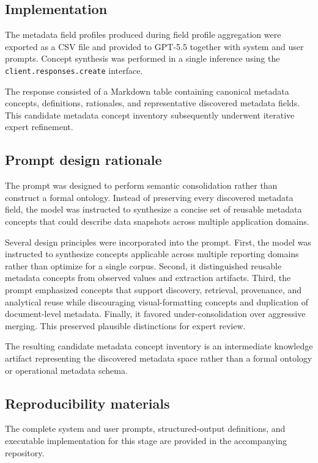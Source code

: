 \documentclass{article}
\begin{document}
\subsection{Implementation}

The metadata field profiles produced during field profile aggregation were exported as a CSV file and provided to GPT-5.5 together with system and user prompts. Concept synthesis was performed in a single inference using the \texttt{client.responses.create} interface.

The response consisted of a Markdown table containing canonical metadata concepts, definitions, rationales, and representative discovered metadata fields. This candidate metadata concept inventory subsequently underwent iterative expert refinement.

\subsection{Prompt design rationale}

The prompt was designed to perform semantic consolidation rather than construct a formal ontology. Instead of preserving every discovered metadata field, the model was instructed to synthesize a concise set of reusable metadata concepts that could describe data snapshots across multiple application domains.

Several design principles were incorporated into the prompt. First, the model was instructed to synthesize concepts applicable across multiple reporting domains rather than optimize for a single corpus. Second, it distinguished reusable metadata concepts from observed values and extraction artifacts. Third, the prompt emphasized concepts that support discovery, retrieval, provenance, and analytical reuse while discouraging visual-formatting concepts and duplication of document-level metadata. Finally, it favored under-consolidation over aggressive merging. This preserved plausible distinctions for expert review.

The resulting candidate metadata concept inventory is an intermediate knowledge artifact representing the discovered metadata space rather than a formal ontology or operational metadata schema.

\subsection{Reproducibility materials}

The complete system and user prompts, structured-output definitions, and executable implementation for this stage are provided in the accompanying repository.
\end{document}
